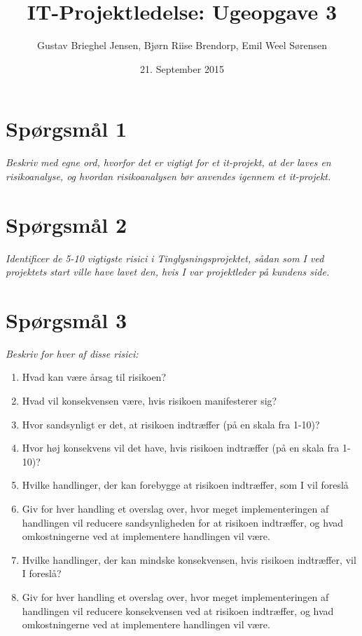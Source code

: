 \documentclass{article}
\title{IT-Projektledelse: Ugeopgave 3}
\author{Gustav Brieghel Jensen, Bjørn Riise Brendorp, Emil Weel Sørensen  }
\date{21. September 2015}
\begin{document}
\maketitle

\section*{Spørgsmål 1}
\textit{Beskriv med egne ord, hvorfor det er vigtigt for et it-projekt, at der laves en risikoanalyse, og hvordan
risikoanalysen bør anvendes igennem et it-projekt.} \\

\section*{Spørgsmål 2}
\textit{Identificer de 5-10 vigtigste risici i Tinglysningsprojektet, sådan som I ved projektets start ville have
lavet den, hvis I var projektleder på kundens side.} \\

\section*{Spørgsmål 3}
\textit{Beskriv for hver af disse risici:} \\
\begin{enumerate}
\item Hvad kan være årsag til risikoen?
\item Hvad vil konsekvensen være, hvis risikoen manifesterer sig?
\item Hvor sandsynligt er det, at risikoen indtræffer (på en skala fra 1-10)?
\item Hvor høj konsekvens vil det have, hvis risikoen indtræffer (på en skala fra 1-10)?
\item Hvilke handlinger, der kan forebygge at risikoen indtræffer, som I vil foreslå
\item Giv for hver handling et overslag over, hvor meget implementeringen af handlingen vil
reducere sandsynligheden for at risikoen indtræffer, og hvad omkostningerne ved at
implementere handlingen vil være.
\item Hvilke handlinger, der kan mindske konsekvensen, hvis risikoen indtræffer, vil I foreslå?
\item Giv for hver handling et overslag over, hvor meget implementeringen af handlingen vil
reducere konsekvensen ved at risikoen indtræffer, og hvad omkostningerne ved at
implementere handlingen vil være.
\end{enumerate}
\end{document}
